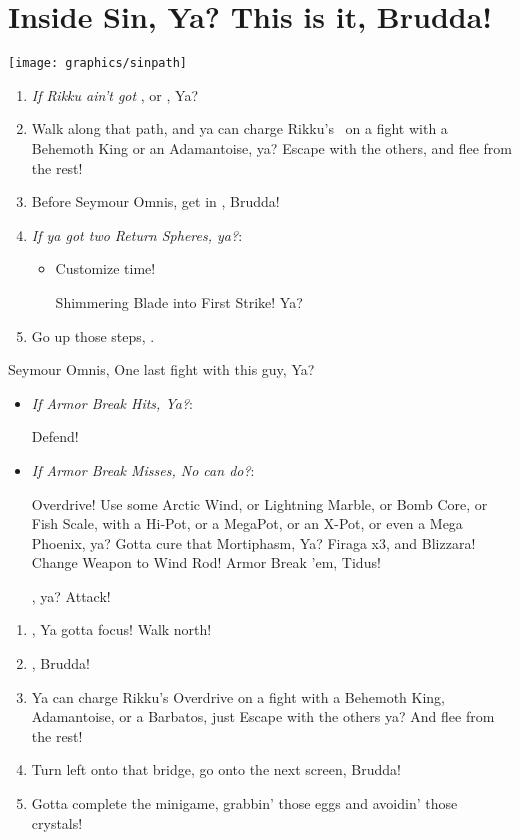 \chapter{Inside Sin, Ya? This is it, Brudda!}
\texttt{[image: graphics/sinpath]}
\begin{enumerate}
\item \textit{If Rikku ain't got \od} \formation{\tidus}{\auron}{\rikku}, or \formation{\tidus}{\auron}{\kimahri}, Ya?
\item Walk along that path, and ya can charge Rikku's \od\ on a fight with a Behemoth King or an Adamantoise, ya? Escape with the others, and flee from the rest!
\item Before Seymour Omnis, get in \formation{\tidus}{\auron}{\yuna}, Brudda!
\item \textit{If ya got two Return Spheres, ya?}:
\begin{itemize}
\item Customize time!
\begin{itemize}
\auronf Shimmering Blade into First Strike! Ya?
\end{itemize}
\end{itemize}
\item Go up those steps, \sd.
\end{enumerate}
\begin{battle}[80000]{Seymour Omnis, One last fight with this guy, Ya?}
\begin{itemize}
\yunaf Defend, Gotta protect Yuna, ya?
\tidusf Armor Break 'em, Tidus!
\item \textit{If Armor Break Hits, Ya?}:
\begin{itemize}
\auronf Defend!
\end{itemize}
\item \textit{If Armor Break Misses, No can do?}:
\begin{itemize}
\switch{\auron}{\rikku}
\rikkuf Overdrive! Use some Arctic Wind, or Lightning Marble, or Bomb Core, or Fish Scale, with a Hi-Pot, or a MegaPot, or an X-Pot, or even a Mega Phoenix, ya?
\yunaf Gotta cure that Mortiphasm, Ya?
\enemyf Firaga x3, and Blizzara!
\yunaf Change Weapon to Wind Rod!
\tidusf Armor Break 'em, Tidus!
\end{itemize}
\summon{\bahamut}, ya?
\bahamutf Attack!
\end{itemize}
\end{battle}
\begin{enumerate}[resume]
\item \sd, Ya gotta focus! Walk north!
\item \formation{\tidus}{\kimahri}{\auron}, Brudda!
\item Ya can charge Rikku's Overdrive on a fight with a Behemoth King, Adamantoise, or a Barbatos, just Escape with the others ya? And flee from the rest!
\item Turn left onto that bridge, go onto the next screen, Brudda!
\item Gotta complete the minigame, grabbin' those eggs and avoidin' those crystals!
\end{enumerate}
